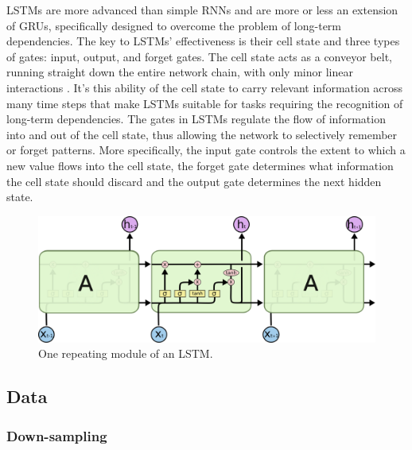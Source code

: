 \documentclass{article}
\begin{document}
 LSTMs are more advanced than simple RNNs and are more or less an extension of GRUs, specifically designed to overcome the problem of long-term dependencies. The key to LSTMs' effectiveness is their cell state and three types of gates: input, output, and forget gates. The cell state acts as a conveyor belt, running straight down the entire network chain, with only minor linear interactions \cite{Olah15}. It’s this ability of the cell state to carry relevant information across many time steps that make LSTMs suitable for tasks requiring the recognition of long-term dependencies. The gates in LSTMs regulate the flow of information into and out of the cell state, thus allowing the network to selectively remember or forget patterns. More specifically, the input gate controls the extent to which a new value flows into the cell state, the forget gate determines what information the cell state should discard and the output gate determines the next hidden state. 
 \begin{figure}[ht]
\vskip 0.2in
\begin{center}
\centerline{\includegraphics[width=\columnwidth]{ML_images/LSTM.png}}
\caption{One repeating module of an LSTM.}
\label{LSTM}
\end{center}
\vskip -0.2in
\end{figure}


\subsection{Data}

\subsubsection{Down-sampling}
\end{document}
